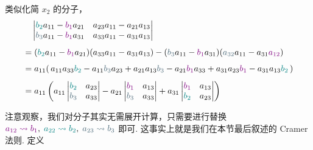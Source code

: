 \documentclass[10pt,openany]{article}
\theoremstyle{thmstyle} %
\theoremstyle{defstyle} %
\theoremstyle{prostyle} %
\theoremstyle{exastyle}
\theoremstyle{remstyle}
\begin{document}
类似化简 \( x_2 \) 的分子，
\begin{align*}
	& \quad \begin{vmatrix}
		{\color{teal} b_2} a_{11} - {\color{violet} b_1} a_{21} & a_{23} a_{11} - a_{21} a_{13} \\
		{\color{cyan!40!black} b_3} a_{11} - {\color{violet} b_1} a_{31} & a_{33} a_{11} - a_{31} a_{13}
	\end{vmatrix} \\[1ex]
	&= ({\color{teal} b_2} a_{11} - {\color{violet} b_1} a_{21})(a_{33} a_{11} - a_{31} a_{13}) - ({\color{cyan!40!black} b_3} a_{11} - {\color{violet} b_1} a_{31})({\color{cyan!40!black} a_{32}} a_{11} - a_{31} {\color{violet} a_{12}}) \\[1ex]
	&= a_{11}(\, a_{11} a_{33} {\color{teal} b_2}- a_{11} {\color{cyan!40!black} b_{3}} a_{23}  + a_{21} a_{13} {\color{cyan!40!black} b_{3}} - a_{21} {\color{violet} b_{1}} a_{33} + a_{31} a_{23} {\color{violet} b_{1}} - a_{31} a_{13}  {\color{teal} b_{2}} \,) \\[1ex]
	&= a_{11} \left( a_{11} \begin{vmatrix}
		{\color{teal} b_{2}} & a_{23} \\
		{\color{cyan!40!black} b_{3}} & a_{33}
	\end{vmatrix}
	- a_{21} \begin{vmatrix}
		{\color{violet} b_{1}} & a_{13} \\
		{\color{cyan!40!black} b_{3}} & a_{33} 
	\end{vmatrix}
	+ a_{31} \begin{vmatrix}
		{\color{violet} b_{1}} & a_{13} \\
		{\color{teal} b_{2}} & a_{23} 
	\end{vmatrix} \right)
\end{align*}

注意观察，我们对分子其实无需展开计算，只需要进行替换 \( {\color{violet} a_{12} \leadsto b_1}, \; {\color{teal} a_{22} \leadsto b_2}, \; {\color{cyan!40!black} a_{23} \leadsto b_3} \) 即可. 这事实上就是我们在本节最后叙述的 Cramer 法则. 定义
\end{document}

